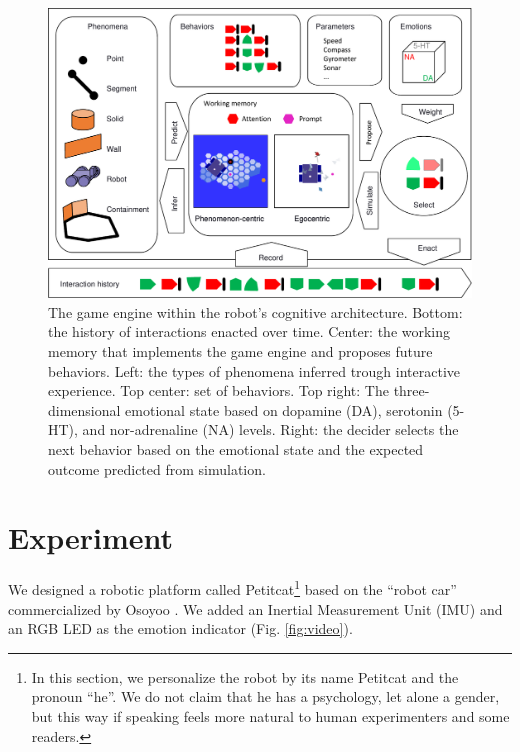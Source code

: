 \documentclass[runningheads]{llncs}
\begin{document}
\begin{figure}
	\includegraphics[width=\textwidth]{Figure_geith.pdf}
	\caption{The game engine within the robot's cognitive architecture.
	Bottom: the history of interactions enacted over time.
	Center: the working memory that implements the game engine and proposes future behaviors.
	Left: the types of phenomena inferred trough interactive experience.
	Top center: set of behaviors.
	Top right: The three-dimensional emotional state based on dopamine (DA), serotonin (5-HT), and nor-adrenaline (NA) levels.
	Right: the decider selects the next behavior based on the emotional state and the expected outcome predicted from simulation.} \label{fig:geith}
\end{figure}



\section{Experiment}
\label{sec:expe}

We designed a robotic platform called Petitcat\footnote{In this section, we personalize the robot by its name Petitcat and the pronoun ``he''. We do not claim that he has a psychology, let alone a gender, but this way if speaking feels more natural to human experimenters and some readers.} based on the ``robot car'' commercialized by Osoyoo \cite{osoyoo_robot_car}.
We added an Inertial Measurement Unit (IMU) and an RGB LED as the emotion indicator (Fig. \ref{fig:video}). 
\end{document}
